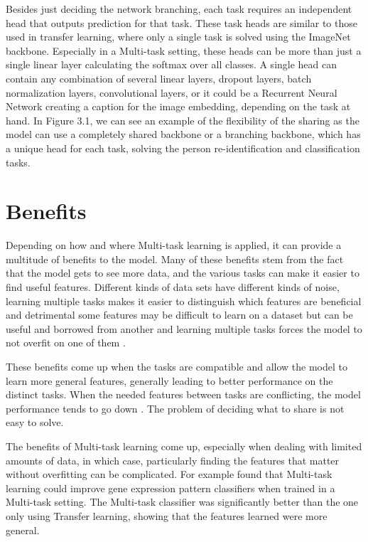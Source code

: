 Besides just deciding the network branching, each task requires an independent head that outputs prediction for that task.
These task heads are similar to those used in transfer learning, where only a single task is solved using the ImageNet backbone.
Especially in a Multi-task setting, these heads can be more than just a single linear layer calculating the softmax over all classes.
A single head can contain any combination of several linear layers, dropout layers, batch normalization layers, convolutional layers, or it could be a Recurrent Neural Network creating a caption for the image embedding, depending on the task at hand.
In Figure 3.1, we can see an example of the flexibility of the sharing as the model can use a completely shared backbone or a branching backbone, which has a unique head for each task, solving the person re-identification and classification tasks.

\section{Benefits}
Depending on how and where Multi-task learning is applied, it can provide a multitude of benefits to the model.
Many of these benefits stem from the fact that the model gets to see more data, and the various tasks can make it easier to find useful features.
Different kinds of data sets have different kinds of noise, learning multiple tasks makes it easier to distinguish which features are beneficial and detrimental some features may be difficult to learn on a dataset but can be useful and borrowed from another and learning multiple tasks forces the model to not overfit on one of them \citep{ruderOverview}.

These benefits come up when the tasks are compatible and allow the model to learn more general features, generally leading to better performance on the distinct tasks.
When the needed features between tasks are conflicting, the model performance tends to go down \citep{uberNet}.
The problem of deciding what to share is not easy to solve.

The benefits of Multi-task learning come up, especially when dealing with limited amounts of data, in which case, particularly finding the features that matter without overfitting can be complicated.
For example \citep{biologicalMultitask} found that Multi-task learning could improve gene expression pattern classifiers when trained in a Multi-task setting.
The Multi-task classifier was significantly better than the one only using Transfer learning, showing that the features learned were more general.

